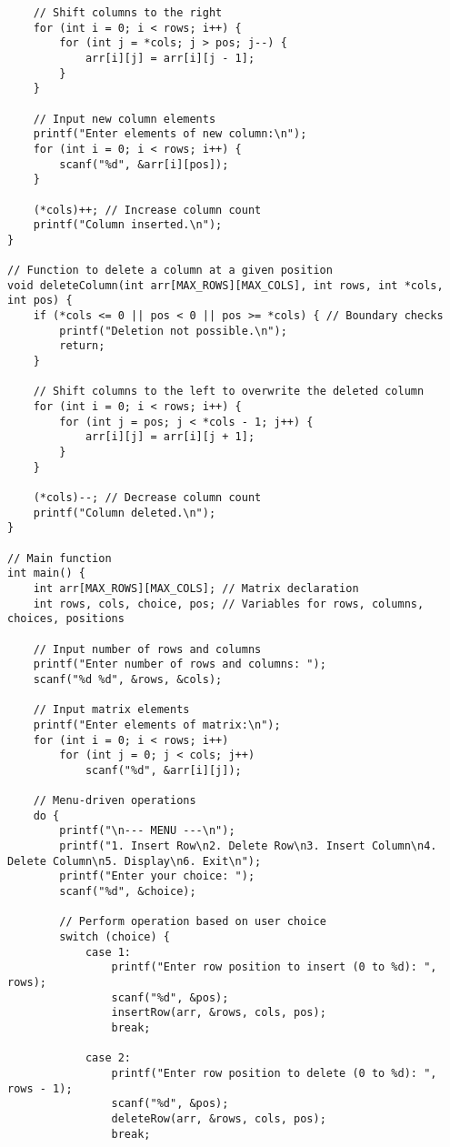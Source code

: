 \documentclass[12pt,a4paper]{article}
\begin{document}
\begin{lstlisting}
    // Shift columns to the right
    for (int i = 0; i < rows; i++) {
        for (int j = *cols; j > pos; j--) {
            arr[i][j] = arr[i][j - 1];
        }
    }

    // Input new column elements
    printf("Enter elements of new column:\n");
    for (int i = 0; i < rows; i++) {
        scanf("%d", &arr[i][pos]);
    }

    (*cols)++; // Increase column count
    printf("Column inserted.\n");
}

// Function to delete a column at a given position
void deleteColumn(int arr[MAX_ROWS][MAX_COLS], int rows, int *cols, int pos) {
    if (*cols <= 0 || pos < 0 || pos >= *cols) { // Boundary checks
        printf("Deletion not possible.\n");
        return;
    }

    // Shift columns to the left to overwrite the deleted column
    for (int i = 0; i < rows; i++) {
        for (int j = pos; j < *cols - 1; j++) {
            arr[i][j] = arr[i][j + 1];
        }
    }

    (*cols)--; // Decrease column count
    printf("Column deleted.\n");
}

// Main function
int main() {
    int arr[MAX_ROWS][MAX_COLS]; // Matrix declaration
    int rows, cols, choice, pos; // Variables for rows, columns, choices, positions

    // Input number of rows and columns
    printf("Enter number of rows and columns: ");
    scanf("%d %d", &rows, &cols);

    // Input matrix elements
    printf("Enter elements of matrix:\n");
    for (int i = 0; i < rows; i++)
        for (int j = 0; j < cols; j++)
            scanf("%d", &arr[i][j]);

    // Menu-driven operations
    do {
        printf("\n--- MENU ---\n");
        printf("1. Insert Row\n2. Delete Row\n3. Insert Column\n4. Delete Column\n5. Display\n6. Exit\n");
        printf("Enter your choice: ");
        scanf("%d", &choice);

        // Perform operation based on user choice
        switch (choice) {
            case 1:
                printf("Enter row position to insert (0 to %d): ", rows);
                scanf("%d", &pos);
                insertRow(arr, &rows, cols, pos);
                break;

            case 2:
                printf("Enter row position to delete (0 to %d): ", rows - 1);
                scanf("%d", &pos);
                deleteRow(arr, &rows, cols, pos);
                break;


\end{lstlisting}
\end{document}
